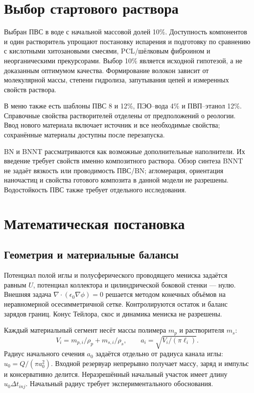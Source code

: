 \documentclass[12pt,a4paper]{article}
\begin{document}
\section{Выбор стартового раствора}
Выбран ПВС в воде с начальной массовой долей 10\%. Доступность компонентов и
один растворитель упрощают постановку испарения и подготовку по сравнению
с кислотными хитозановыми смесями, PCL/шёлковым фиброином и неорганическими
прекурсорами. Выбор 10\% является исходной гипотезой, а не доказанным
оптимумом качества. Формирование волокон зависит от молекулярной массы,
степени гидролиза, запутывания цепей и измеренных свойств раствора.

В меню также есть шаблоны ПВС 8 и 12\%, ПЭО--вода 4\% и ПВП--этанол 12\%.
Справочные свойства растворителей отделены от предположений о реологии.
Ввод нового материала включает источник и все необходимые свойства;
сохранённые материалы доступны после перезапуска.

BN и BNNT рассматриваются как возможные дополнительные наполнители.
Их введение требует свойств именно композитного раствора. Обзор синтеза
BNNT не задаёт вязкость или проводимость ПВС/BN; агломерация, ориентация
наночастиц и свойства готового композита в данной модели не разрешены.
Водостойкость ПВС также требует отдельного исследования.

\section{Математическая постановка}
\subsection{Геометрия и материальные балансы}
Потенциал полой иглы и полусферического проводящего мениска задаётся равным
$U$, потенциал коллектора и цилиндрической боковой стенки — нулю. Внешняя
задача $\nabla\cdot(\epsilon_0\nabla\phi)=0$ решается методом конечных объёмов
на неравномерной осесимметричной сетке. Контролируются остаток и баланс
зарядов границ. Конус Тейлора, скос и динамика мениска не разрешены.

Каждый материальный сегмент несёт массы полимера $m_p$ и растворителя $m_s$:
\[
 V_i=m_{p,i}/\rho_p+m_{s,i}/\rho_s,\qquad
 a_i=\sqrt{V_i/(\pi\ell_i)}.
\]
Радиус начального сечения $a_0$ задаётся отдельно от радиуса канала иглы:
$u_0=Q/(\pi a_0^2)$. Входной резервуар непрерывно получает массу, заряд и
импульс и консервативно делится. Неразрешённый начальный участок имеет
длину $u_0\Delta t_{inj}$. Начальный радиус требует экспериментального обоснования.
\end{document}
